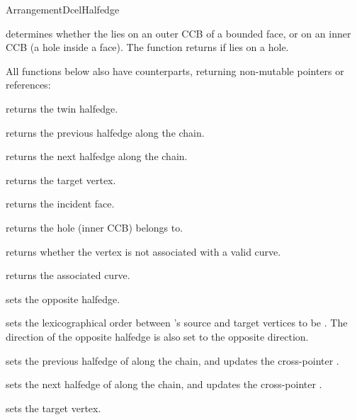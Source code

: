 \begin{ccRefConcept}{ArrangementDcelHalfedge}
{
    {determines whether the \ccVar{} lies on an outer CCB of a bounded face,
     or on an inner CCB (a hole inside a face). The function returns 
     if \ccVar{} lies on a hole.}

All functions below also have  counterparts, returning non-mutable
pointers or references:

    {returns the twin halfedge.}

    {returns the previous halfedge along the chain.}

    {returns the next halfedge along the chain.}

    {returns the target vertex.}

    {returns the incident face.
     }

    {returns the hole (inner CCB) \ccVar{} belongs to.
     }

    {returns whether the vertex is not associated with a valid curve.}
 
    {returns the associated curve.
     }

\ccModifiers

    {sets the opposite halfedge.}

    {sets the lexicographical order between \ccVar{}'s source and target
     vertices to be . The direction of the opposite halfedge is
     also set to the opposite direction.
     }

    {sets the previous halfedge of \ccVar{} along the chain,
     and updates the cross-pointer .}

    {sets the next halfedge of \ccVar{} along the chain,
     and updates the cross-pointer .}

    {sets the target vertex.}

}
\end{ccRefConcept}
